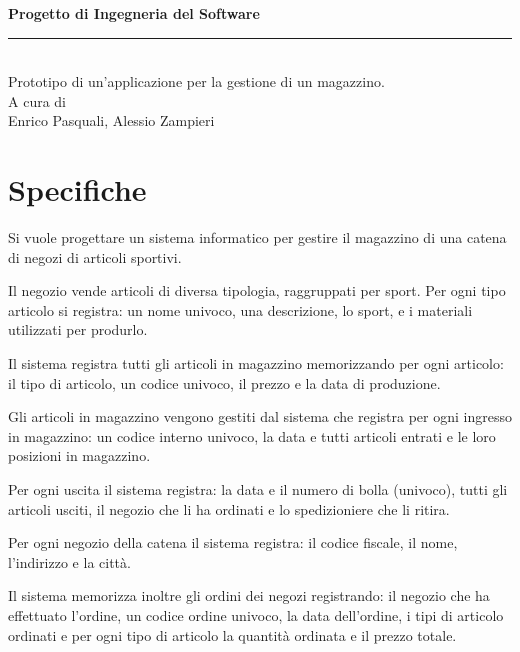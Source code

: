 \documentclass[a4paper]{article}
\begin{document}
\author{Enrico Pasquali \and Alessio Zampieri}


	\begin{titlepage}
	\begin{center}
		
		{ \huge \bfseries Progetto di Ingegneria del Software \ }
		\rule{11cm}{.4pt} 
		\\ [0.3cm]
		{\large Prototipo di un'applicazione per la gestione di un magazzino.}
		\\ [1cm]
		{ \large A cura di \\  {Enrico Pasquali, Alessio Zampieri} }

	\end{center}
	\end{titlepage}

	\tableofcontents
	\newpage

	\section{Specifiche}
	Si vuole progettare un sistema informatico per gestire il magazzino di una catena di negozi di articoli sportivi.
	
	Il negozio vende articoli di diversa tipologia, raggruppati per sport. Per ogni tipo articolo si registra: un nome univoco, una descrizione, lo sport, e i materiali utilizzati per produrlo. 
	
	Il sistema registra tutti gli articoli in magazzino	memorizzando per ogni articolo: il tipo di articolo, un codice univoco, il prezzo e la data di produzione.
	
	Gli articoli in magazzino vengono gestiti dal sistema che registra per ogni ingresso in magazzino: un codice interno univoco, la data e tutti articoli entrati e le loro posizioni in magazzino. 
	
	Per ogni uscita il sistema registra: la data e il numero di bolla (univoco), tutti gli articoli usciti, il negozio che li ha ordinati e lo spedizioniere che li ritira. 
	
	Per ogni negozio della catena il sistema registra: il codice fiscale, il nome, l’indirizzo e la città.
	
	Il sistema memorizza inoltre gli ordini dei negozi registrando: il negozio che ha effettuato l’ordine, un codice ordine univoco, la data dell’ordine, i tipi di articolo ordinati e per ogni tipo di articolo la quantità ordinata e il prezzo totale.
	
\end{document}
